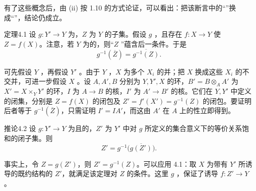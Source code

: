 有了这些概念后，由 (ii) 按 1.10 的方式论证，可以看出：把该断言中的“”换成“”，结论仍成立。

\begin{SGAresult}{定理}{4.1}
设 $g:Y'\to Y$ 为，$Z$ 为 $Y$ 的子集。假设 $g$ ，且存在 $f:X\to Y$ 使 $Z=f(X)$。注意，若 $Y$ 为的，则“$Z$ ”蕴含后一条件。于是
\[
g^{-1}(\overline Z)=\overline{g^{-1}(Z)}.
\]
\end{SGAresult}
可先假设 $Y$ ，再假设 $Y'$ 。由于 $Y$ ，$X$ 为多个 $X_i$ 的并；把 $X$ 换成这些 $X_i$ 的不交并，可进一步假设 $X$ 。设 $A,A',B$ 分别为 $Y,Y',X$ 的环，$B'=B\otimes_A A'$ 为 $X'=X\times_Y Y'$ 的环，$I$ 为 $A\to B$ 的核，$I'$ 为 $A'\to B'$ 的核。它们在 $Y,Y'$ 中定义的闭集，分别是 $Z=f(X)$ 的闭包及 $Z'=f'(X')=g^{-1}(Z)$ 的闭包。要证明后者等于 $g^{-1}(\overline Z)$，只需证明 $I'=IA'$，而这由 $A'$ 在 $A$ 上的性立即得到。

\begin{SGAresult}{推论}{4.2}
设 $g:Y'\to Y$ 为且的，$Z'$ 为 $Y'$ 中对 $g$ 所定义的集合意义下的等价关系饱和的闭子集。则
\[
Z'=g^{-1}\bigl(\overline{g(Z')}\bigr).
\]
\end{SGAresult}
事实上，令 $Z=g(Z')$，则 $Z'=g^{-1}(Z)$。可以应用 4.1：取 $X$ 为带有 $Y'$ 所诱导的既约结构的 $Z'$，就满足该定理对 $Z$ 的条件。这里 $g$ ，保证了诱导 $f:Z'\to Y$ 。

